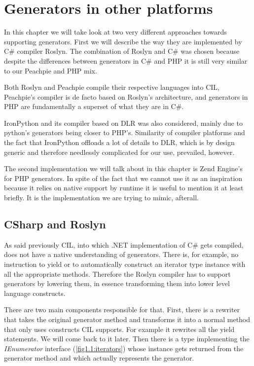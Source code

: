 \chapter{Generators in other platforms}

In this chapter we will take look at two very different approaches towards supporting generators. First we will describe the way they are implemented by C\# compiler Roslyn. The combination of Roslyn and C\# was chosen because despite the differences between generators in C\# and PHP it is still very similar to our Peachpie and PHP mix.

Both Roslyn and Peachpie compile their respective languages into CIL, Peachpie’s compiler is de facto based on Roslyn’s architecture, and generators in PHP are fundamentally a superset of what they are in C\#. 

IronPython and its compiler based on DLR was also considered, mainly due to python’s generators being closer to PHP’s. Similarity of compiler platforms and the fact that IronPython offloads a lot of details to DLR, which is by design generic and therefore needlessly complicated for our use, prevailed, however. 

The second implementation we will talk about in this chapter is Zend Engine’s for PHP generators. In spite of the fact that we cannot use it as an inspiration because it relies on native support by runtime it is useful to mention it at least briefly. It is the implementation we are trying to mimic, afterall.

\section{CSharp and Roslyn}\label{sec:3:1}

As said previously CIL, into which .NET implementation of C\# gets compiled, does not have a native understanding of generators. There is, for example, no instruction to yield or to automatically construct an iterator type instance with all the appropriate methods. Therefore the Roslyn compiler has to support generators by lowering them, in essence transforming them into lower level language constructs. 

There are two main components responsible for that. First, there is a rewriter that takes the original generator method and transforms it into a normal method that only uses constructs CIL supports. For example it rewrites all the yield statements. We will come back to it later. Then there is a type implementing the \emph{IEnumerator} interface (\autoref{fig1.1:iterators}) whose instance gets returned from the generator method and which actually represents the generator.



